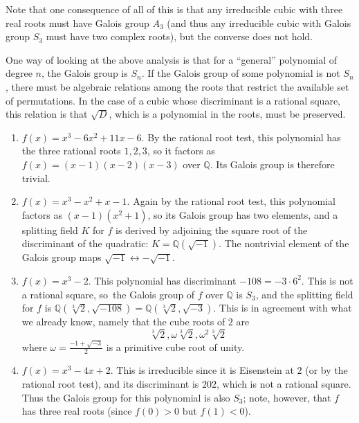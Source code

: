 \documentclass[a4paper,10pt]{article}
\newcommand{\Rats}{\ensuremath{\mathbb Q}}
\theoremstyle{definition}
\begin{document}
Note that one consequence of all of this is that any irreducible cubic with
three real roots must have Galois group $A_3$ (and thus any irreducible cubic
with Galois group $S_3$ must have two complex roots), but the converse does not
hold.

One way of looking at the above analysis is that for a
``general'' polynomial of degree $n$, the Galois group is $S_n$. If the Galois
group of some polynomial is not $S_n$, there must be algebraic relations among
the roots that restrict the available set of permutations. In the case of a
cubic whose discriminant is a rational square, this relation is that $\sqrt{D}$,
which is a polynomial in the roots, must be preserved.

\begin{enumerate}
\renewcommand{\labelenumi}{Example \arabic{enumi}}

\item $f(x)=x^3-6x^2+11x-6$. By the rational root test, this polynomial has the three rational roots $1,2,3$, so it factors as $f(x)=(x-1)(x-2)(x-3)$ over $\Rats$. Its Galois group is therefore trivial.

\item $f(x)=x^3-x^2+x-1$. Again by the rational root test, this polynomial factors as $(x-1)(x^2+1)$, so its Galois group has two elements, and a splitting field $K$ for $f$ is derived by adjoining the square root of the discriminant of the quadratic: $K=\Rats(\sqrt{-1})$. The nontrivial element of the Galois group maps $\sqrt{-1}\leftrightarrow -\sqrt{-1}$.

\item $f(x)=x^3-2$. This polynomial has discriminant $-108=-3\cdot 6^2$. This is not a rational square, so\ the Galois group of $f$ over $\Rats$ is $S_3$, and the splitting field for $f$ is $\Rats(\sqrt[3]{2},\sqrt{-108})=\Rats(\sqrt[3]{2},\sqrt{-3})$. This is in agreement with what we already know, namely that the cube roots of $2$ are
\[\sqrt[3]{2}, \omega\sqrt[3]{2}, \omega^2\sqrt[3]{2}\]
where $\omega=\frac{-1+\sqrt{-3}}{2}$ is a primitive cube root of unity.

\item $f(x)=x^3-4x+2$. This is irreducible since it is Eisenstein at $2$ (or by the rational root test), and its discriminant is $202$, which is not a rational square. Thus the Galois group for this polynomial is also $S_3$; note, however, that $f$ has three real roots (since $f(0)>0$ but $f(1)<0$).


\end{enumerate}
\end{document}
